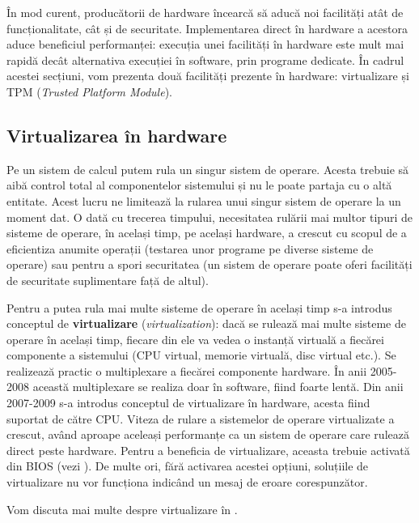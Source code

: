 În mod curent, producătorii de hardware încearcă să aducă noi facilități atât de
funcționalitate, cât și de securitate. Implementarea direct în hardware a
acestora aduce beneficiul performanței: execuția unei facilități în hardware
este mult mai rapidă decât alternativa execuției în software, prin programe
dedicate. În cadrul acestei secțiuni, vom prezenta două facilități prezente în
hardware: virtualizare și TPM 
(\textit{Trusted Platform Module}).

\subsection{Virtualizarea în hardware}
\label{sec:hw:features:virt}

Pe un sistem de calcul putem rula un singur sistem de operare. Acesta trebuie să
aibă control total al componentelor sistemului și nu le poate partaja cu o altă
entitate. Acest lucru ne limitează la rularea unui singur sistem de operare la
un moment dat. O dată cu trecerea timpului, necesitatea rulării mai multor
tipuri de sisteme de operare, în același timp, pe același hardware, a crescut cu
scopul de a eficientiza anumite operații (testarea unor programe pe diverse
sisteme de operare) sau pentru a spori securitatea (un sistem de operare poate
oferi facilități de securitate suplimentare față de altul).

Pentru a putea rula
mai multe sisteme de operare în același timp s-a introdus conceptul de
\textbf{virtualizare} (\textit{virtualization}): dacă se rulează mai multe sisteme de
operare în același timp, fiecare din ele va vedea o instanță virtuală a fiecărei
componente a sistemului (CPU virtual, memorie virtuală, disc virtual etc.). Se
realizează practic o multiplexare a fiecărei componente hardware. În anii
2005-2008 această multiplexare se realiza doar în software, fiind foarte lentă.
Din anii 2007-2009 s-a introdus conceptul de virtualizare în hardware, acesta
fiind suportat de către CPU. Viteza de rulare a sistemelor de operare
virtualizate a crescut, având aproape aceleași performanțe ca un sistem de
operare care rulează direct peste hardware. Pentru a beneficia de virtualizare,
aceasta trebuie activată din BIOS (vezi ).
De multe ori, fără activarea acestei opțiuni, soluțiile de virtualizare nu vor
funcționa indicând un mesaj de eroare corespunzător.

Vom discuta mai multe despre virtualizare în .

